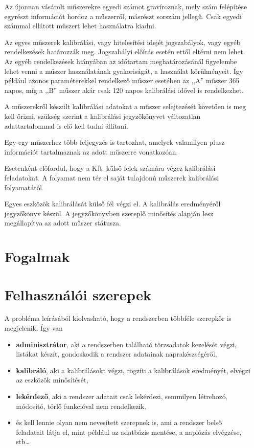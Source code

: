 \documentclass[a4paper,12pt]{report}
\begin{document}
Az újonnan vásárolt műszerekre egyedi számot gravíroznak, mely szám felépítése 
egyrészt információt hordoz a műszerről, másrészt sorszám jellegű. Csak egyedi 
számmal ellátott műszert lehet használatra kiadni. 

Az egyes műszerek kalibrálási, vagy hitelesítési idejét jogszabályok, vagy egyéb
rendelkezések határozzák meg. Jogszabályi előírás esetén ettől eltérni nem 
lehet. Az egyéb rendelkezések hiányában az időtartam meghatározásánál figyelembe
lehet venni a műszer használatának gyakoriságát, a használat körülményeit.
Így például azonos paraméterekkel rendelkező műszer esetében az ,,A'' műszer
365 napos, míg a ,,B'' műszer akár csak 120 napos kalibrálási idővel is rendelkezhet.

A műszerekről készült kalibrálási adatokat a műszer selejtezését követően is 
meg kell őrizni, szükség szerint a kalibrálási jegyzőkönyvet változatlan 
adattartalommal is elő kell tudni állítani.

Egy-egy műszerhez több feljegyzés is tartozhat, amelyek valamilyen plusz 
információt tartalmaznak az adott műszerre vonatkozóan. 

Esetenként előfordul, hogy a Kft. külső felek számára végez kalibrálási 
feladatokat. A folyamat nem tér el saját tulajdonú műszerek kalibrálási 
folyamatától.

Egyes eszközök kalibrálását külső fél végzi el. A kalibrálás eredményéről jegyzőkönyv
készül. A jegyzőkönyvben szereplő minősítés alapján lesz megállapítva az adott műszer státusza.

\section{Fogalmak}

\let\clearpage\relax



\section{Felhasználói szerepek}
A probléma leírásából kiolvasható, hogy a rendszerben többféle szerepkör is 
megjelenik. Így van
\begin{itemize}
 \item \textbf{adminisztrátor}, aki a rendszerben található törzsadatok 
kezelését végzi, listákat készít, gondoskodik a rendszer adatainak 
naprakészségéről,
\item \textbf{kalibráló}, aki a kalibrálásokt végzi, rögzíti a kalibrálások 
eredményét, elvégzi az eszközök minősítését,
\item \textbf{lekérdező}, aki a rendszer adatait csak lekérdezi, semmilyen 
létrehozó, módosító, törlő funkcióval nem rendelkezik,
\item és kell lennie olyan nem nevesített szerepnek is, ami a rendszer belső 
feladatait látja el, mint például az adatbázis mentése, a naplózás elvégzése, 
stb\dots
\end{itemize}
\end{document}
